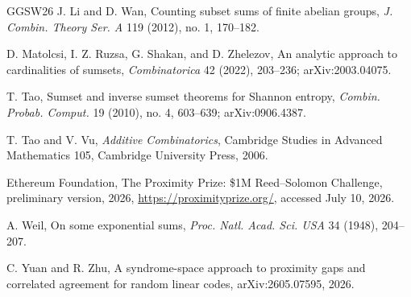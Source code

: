 \documentclass[12pt,a4paper]{amsart}
\numberwithin{equation}{section}
\theoremstyle{remark}
\begin{document}
\begin{thebibliography}{GGSW26}
J. Li and D. Wan,
\newblock Counting subset sums of finite abelian groups,
\newblock \emph{J. Combin. Theory Ser. A} 119 (2012), no. 1, 170--182.

D. Matolcsi, I. Z. Ruzsa, G. Shakan, and D. Zhelezov,
\newblock An analytic approach to cardinalities of sumsets,
\newblock \emph{Combinatorica} 42 (2022), 203--236; arXiv:2003.04075.

T. Tao,
\newblock Sumset and inverse sumset theorems for Shannon entropy,
\newblock \emph{Combin. Probab. Comput.} 19 (2010), no. 4, 603--639; arXiv:0906.4387.

T. Tao and V. Vu,
\newblock \emph{Additive Combinatorics},
\newblock Cambridge Studies in Advanced Mathematics 105, Cambridge University Press, 2006.

{Ethereum Foundation},
\newblock The Proximity Prize: \$1M Reed--Solomon Challenge,
\newblock preliminary version, 2026,
\newblock \url{https://proximityprize.org/}, accessed July 10, 2026.

A. Weil,
\newblock On some exponential sums,
\newblock \emph{Proc. Natl. Acad. Sci. USA} 34 (1948), 204--207.

C. Yuan and R. Zhu,
\newblock A syndrome-space approach to proximity gaps and correlated
agreement for random linear codes,
\newblock arXiv:2605.07595, 2026.

\end{thebibliography}
\end{document}
